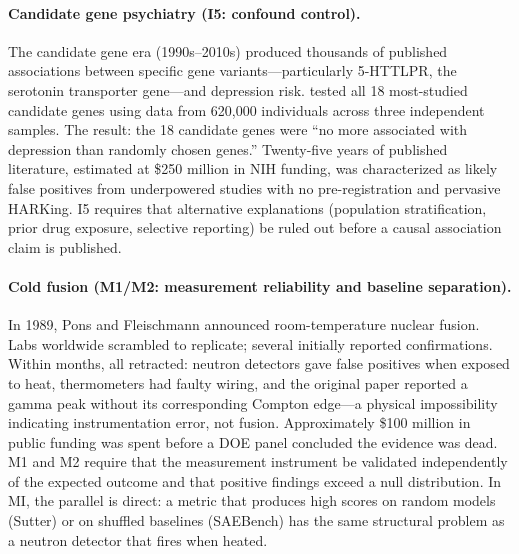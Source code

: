 \documentclass{article}
\begin{document}
\paragraph{Candidate gene psychiatry (I5: confound control).}
The candidate gene era (1990s--2010s) produced thousands of published associations between specific gene variants---particularly 5-HTTLPR, the serotonin transporter gene---and depression risk. \citet{border2019no} tested all 18 most-studied candidate genes using data from 620,000 individuals across three independent samples. The result: the 18 candidate genes were ``no more associated with depression than randomly chosen genes.'' Twenty-five years of published literature, estimated at \$250 million in NIH funding, was characterized as likely false positives from underpowered studies with no pre-registration and pervasive HARKing. I5 requires that alternative explanations (population stratification, prior drug exposure, selective reporting) be ruled out before a causal association claim is published.

\paragraph{Cold fusion (M1/M2: measurement reliability and baseline separation).}
In 1989, Pons and Fleischmann announced room-temperature nuclear fusion. Labs worldwide scrambled to replicate; several initially reported confirmations. Within months, all retracted: neutron detectors gave false positives when exposed to heat, thermometers had faulty wiring, and the original paper reported a gamma peak without its corresponding Compton edge---a physical impossibility indicating instrumentation error, not fusion. Approximately \$100 million in public funding was spent before a DOE panel concluded the evidence was dead. M1 and M2 require that the measurement instrument be validated independently of the expected outcome and that positive findings exceed a null distribution. In MI, the parallel is direct: a metric that produces high scores on random models (Sutter) or on shuffled baselines (SAEBench) has the same structural problem as a neutron detector that fires when heated.
\end{document}
